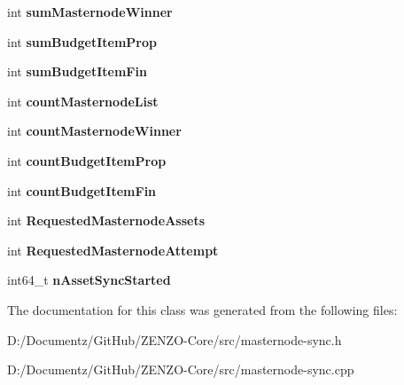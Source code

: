 \begin{DoxyCompactItemize}
int {\bfseries sum\+Masternode\+Winner}
\item 
\mbox{\label{class_c_masternode_sync_a4af49fa0ff3d83af9586b8dc0ef2cff2}} 
int {\bfseries sum\+Budget\+Item\+Prop}
\item 
\mbox{\label{class_c_masternode_sync_a5d2346ccd760d5c60aa3d524f2c728a7}} 
int {\bfseries sum\+Budget\+Item\+Fin}
\item 
\mbox{\label{class_c_masternode_sync_a553511c9e94d9fd54b333f0d08b5d983}} 
int {\bfseries count\+Masternode\+List}
\item 
\mbox{\label{class_c_masternode_sync_a9f4de5c60336ed2b8c09181a75248fc8}} 
int {\bfseries count\+Masternode\+Winner}
\item 
\mbox{\label{class_c_masternode_sync_a7eaf5b92aa75c86d5b7f2b8a2c5f97ae}} 
int {\bfseries count\+Budget\+Item\+Prop}
\item 
\mbox{\label{class_c_masternode_sync_adeb982a5cb4d05fbbe89bf91e93414fc}} 
int {\bfseries count\+Budget\+Item\+Fin}
\item 
\mbox{\label{class_c_masternode_sync_a9615511c1a4e1646dc81c91d06acb1e3}} 
int {\bfseries Requested\+Masternode\+Assets}
\item 
\mbox{\label{class_c_masternode_sync_a9595313d7322739818728593443e0484}} 
int {\bfseries Requested\+Masternode\+Attempt}
\item 
\mbox{\label{class_c_masternode_sync_aa759b160e8fd190a1419b4e5c35bcd05}} 
int64\+\_\+t {\bfseries n\+Asset\+Sync\+Started}
\end{DoxyCompactItemize}


The documentation for this class was generated from the following files\+:\begin{DoxyCompactItemize}
\item 
D\+:/\+Documentz/\+Git\+Hub/\+Z\+E\+N\+Z\+O-\/\+Core/src/masternode-\/sync.\+h\item 
D\+:/\+Documentz/\+Git\+Hub/\+Z\+E\+N\+Z\+O-\/\+Core/src/masternode-\/sync.\+cpp\end{DoxyCompactItemize}
